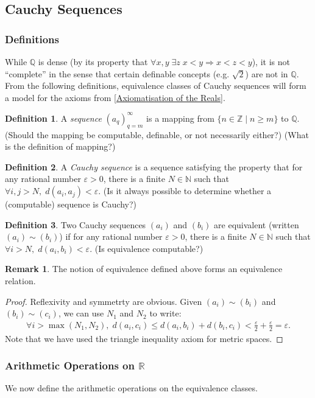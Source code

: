 \documentclass{article}
\theoremstyle{definition}
\newtheorem{defn}{Definition}[subsubsection]
\newtheorem{rmk}{Remark}[subsubsection]
\begin{document}
\newpage
\subsection{Cauchy Sequences}
\subsubsection{Definitions}
While $\mathbb{Q}$ is dense (by its property that $\forall x,y\;\exists z\;x<y\Rightarrow x<z<y$), it is not ``complete'' in the sense that certain definable concepts (e.g. $\sqrt{2}$) are not in $\mathbb{Q}$. From the following definitions, equivalence classes of Cauchy sequences will form a model for the axioms from \ref{Axiomatisation of the Reals}.
\begin{defn}\label{defnsequence}
	A \emph{sequence} $(a_q)_{q=m}^\infty$ is a mapping from $\{n\in\mathbb{Z}\mid n\geq m\}$ to $\mathbb{Q}$. (Should the mapping be computable, definable, or not necessarily either?) (What is the definition of mapping?)
\end{defn}
\begin{defn}
	A \emph{Cauchy sequence} is a sequence satisfying the property that for any rational number $\varepsilon>0$, there is a finite $N\in \mathbb{N}$ such that $\forall i,j>N,\; d(a_i,a_j)<\varepsilon$. (Is it always possible to determine whether a (computable) sequence is Cauchy?)
\end{defn}
\begin{defn}
	Two Cauchy sequences $(a_i)$ and $(b_i)$ are equivalent (written $(a_i)\sim(b_i)$) if for any rational number $\varepsilon>0$, there is a finite $N\in \mathbb{N}$ such that $\forall i>N,\; d(a_i,b_i)<\varepsilon$. (Is equivalence computable?)
\end{defn}
\begin{rmk}
	The notion of equivalence defined above forms an equivalence relation.
\end{rmk}
\begin{proof}
	Reflexivity and symmetrty are obvious. Given $(a_i)\sim(b_i)$ and $(b_i)\sim(c_i)$, we can use $N_1$ and $N_2$ to write:
	\begin{align*}
		\forall i>\max(N_1,N_2),\; d(a_i,c_i)\leq d(a_i,b_i)+d(b_i,c_i)<\frac{\varepsilon}{2}+\frac{\varepsilon}{2}=\varepsilon.
	\end{align*}
	Note that we have used the triangle inequality axiom for metric spaces.
\end{proof}

\subsubsection{Arithmetic Operations on \texorpdfstring{$\mathbb{R}$}{mathbb{R}}}
We now define the arithmetic operations on the equivalence classes.
\end{document}
